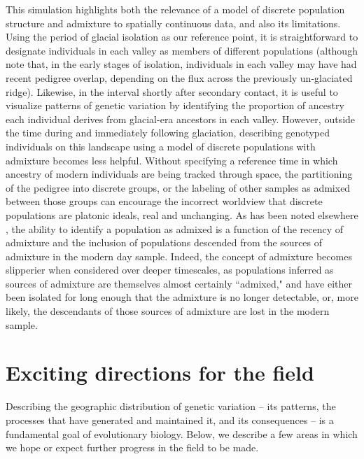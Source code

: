 \documentclass{ar-1col}
\begin{document}
This simulation highlights both the relevance of 
a model of discrete population structure and admixture
to spatially continuous data, 
and also its limitations.
Using the period of glacial isolation as our reference point, 
it is straightforward to designate individuals in each valley 
as members of different populations 
(although note that, in the early stages of isolation, 
individuals in each valley may have had recent pedigree overlap, 
depending on the flux across the previously un-glaciated ridge).
Likewise, 
in the interval shortly after secondary contact, 
it is useful to visualize patterns of genetic variation 
by identifying the proportion of ancestry 
each individual derives from glacial-era ancestors in each valley.
However, 
outside the time during and immediately following glaciation, 
describing genotyped individuals on this landscape 
using a model of discrete populations with admixture 
becomes less helpful.
Without specifying a reference time in which ancestry 
of modern individuals are being tracked through space, 
the partitioning of the pedigree into discrete groups, 
or the labeling of other samples as admixed between those groups
can encourage the incorrect worldview that discrete populations are platonic ideals,
real and unchanging.
As has been noted elsewhere 
\citep{reich_india_2009,patterson_ancient_2012,hellenthal2014genetic,lawson2018tutorial},
the ability to identify a population as admixed
is a function of the recency of admixture and
the inclusion of populations descended 
from the sources of admixture in the modern day sample.
Indeed, the concept of admixture becomes slipperier when considered over deeper timescales,
as populations inferred as sources of admixture are themselves almost certainly ``admixed,"
and have either been isolated for long enough that the admixture is no longer detectable,
or, more likely, the descendants of those sources of admixture are lost in the modern sample.

\section{Exciting directions for the field}

Describing the geographic distribution of genetic variation -- 
its patterns, 
the processes that have generated and maintained it, 
and its consequences -- 
is a fundamental goal of evolutionary biology.
Below, we describe a few areas 
in which we hope or expect further progress in the field to be made.
\end{document}
